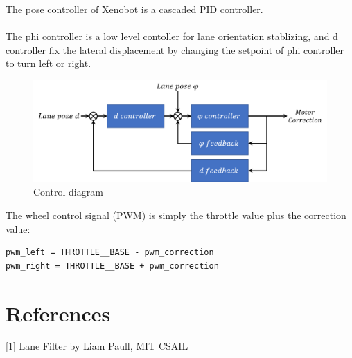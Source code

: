 \documentclass{article}
\begin{document}
The pose controller of Xenobot is a cascaded PID controller.
\\
\\
The phi controller is a low level contoller for lane orientation stablizing, and d controller fix the lateral displacement by changing the setpoint of phi controller to turn left or right.

\begin{figure}[ht]
  \label{fig:control_diagram}
  \centering
  \includegraphics[scale=0.6]{graphs/control_diagram.PNG}
  \caption{Control diagram}
\end{figure}
\FloatBarrier

\noindent The wheel control signal (PWM) is simply the throttle value plus the correction value:

\begin{lstlisting}
pwm_left = THROTTLE__BASE - pwm_correction
pwm_right = THROTTLE__BASE + pwm_correction
\end{lstlisting}

\clearpage

\section{References}

[1] Lane Filter by Liam Paull, MIT CSAIL
\end{document}
